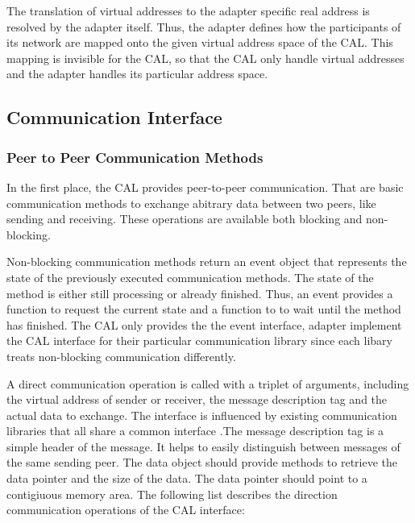 The translation of virtual addresses to the adapter specific real address
is resolved by the adapter itself. Thus, the adapter defines how the participants
of its network are mapped onto the given virtual address space of the CAL. This
mapping is invisible for the CAL, so that the CAL only handle virtual addresses
and the adapter handles its particular address space.

\subsection{Communication Interface}
\label{sec:cal_comm}
\subsubsection{Peer to Peer Communication Methods}

In the first place, the CAL provides peer-to-peer communication. That
are basic communication methods to exchange abitrary data between two
peers, like sending and receiving.  These operations are available
both blocking and non-blocking.

Non-blocking communication methods return an event object that represents
the state of the previously executed communication methods. The state
of the method is either still processing or already finished. Thus, an
event provides a function to request the current state and a function
to to wait until the method has finished. The CAL only provides the
the event interface, adapter implement the CAL interface for their
particular communication library since each libary treats non-blocking
communication differently.

A direct communication operation is called with a triplet of
arguments, including the virtual address of sender or receiver, the
message description tag and the actual data to exchange.  The
interface is influenced by existing communication libraries that all
share a common interface \cite{ref:boost_mpi, ref:boost_asio,
  ref:zmq}.The message description tag is a simple header of the
message. It helps to easily distinguish between messages of the same
sending peer.  The data object should provide methods to retrieve the
data pointer and the size of the data. The data pointer should point
to a contigiuous memory area. The following list describes the
direction communication operations of the CAL interface:

